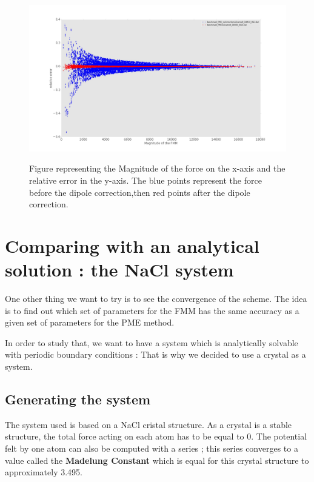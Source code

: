 \documentclass[11pt,twoside,a4paper]{report}
\begin{document}
\begin{figure}[H]
	   \includegraphics[scale=0.2]{magErr_Correction}
	    \label{fig:magnitude}
    \centering 
    \caption{Figure representing the Magnitude of the force on the x-axis and the relative error in the y-axis. The blue points represent the force before the dipole correction,then red points after the dipole correction.}    
    
    \label{fig:magnitude}
   \end{figure}  
   
\section{Comparing with an analytical solution : the NaCl system}

One other thing we want to try is to see the convergence of the scheme. The idea is to find out which set of parameters for the FMM has the same accuracy as a given set of parameters for the PME method. 

In order to study that, we want to have a system which is analytically solvable with periodic boundary conditions : That is why we decided to use a crystal as a system. 

\subsection{Generating the system}

The system used is based on a NaCl cristal structure. As a crystal is a stable structure, the total force acting on each atom has to be equal to 0. The potential felt by one atom can also be computed with a series ; this series converges to a value called the \textbf{Madelung Constant} which is equal for this crystal structure to approximately 3.495.
\end{document}
